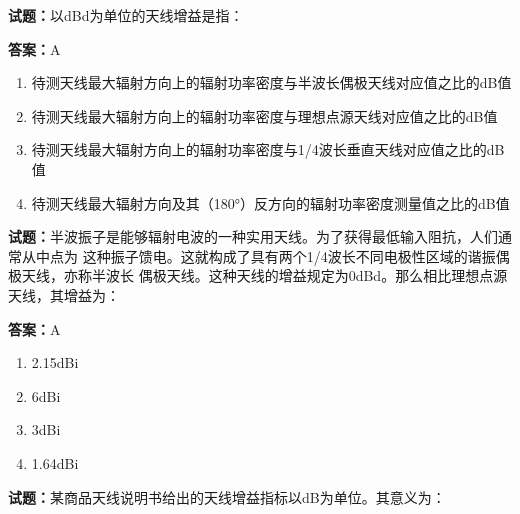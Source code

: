 \documentclass{ctexbook}
\begin{document}


\vspace{1em}

\textbf{试题：}以dBd为单位的天线增益是指： 

\textbf{答案：}A 

\begin{enumerate}[leftmargin=3em]
  \item 待测天线最大辐射方向上的辐射功率密度与半波长偶极天线对应值之比的dB值 

  \item 待测天线最大辐射方向上的辐射功率密度与理想点源天线对应值之比的dB值 

  \item 待测天线最大辐射方向上的辐射功率密度与1/4波长垂直天线对应值之比的dB值 

  \item 待测天线最大辐射方向及其（180°）反方向的辐射功率密度测量值之比的dB值 

\end{enumerate}






\vspace{1em}

\textbf{试题：}半波振子是能够辐射电波的一种实用天线。为了获得最低输入阻抗，人们通常从中点为
这种振子馈电。这就构成了具有两个1/4波长不同电极性区域的谐振偶极天线，亦称半波长
偶极天线。这种天线的增益规定为0dBd。那么相比理想点源天线，其增益为： 

\textbf{答案：}A 

\begin{enumerate}[leftmargin=3em]
  \item 2.15dBi 

  \item 6dBi 

  \item 3dBi 

  \item 1.64dBi 

\end{enumerate}





\vspace{1em}

\textbf{试题：}某商品天线说明书给出的天线增益指标以dB为单位。其意义为： 
\end{document}

